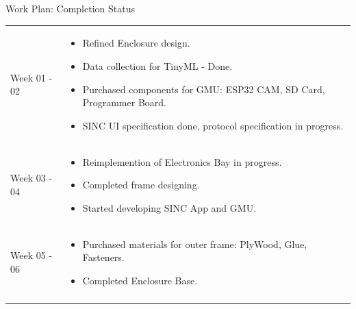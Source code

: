 \documentclass{beamer}
\begin{document}
\begin{frame} {Work Plan: Completion Status}

    \renewcommand\arraystretch{1.75}
    \renewcommand\midrule{{\color{leafColorSecondary} \vspace{-8pt}\rule{\textwidth}{0.75pt}\vspace{8pt}}}


    \begin{tabularx} {\textwidth} {
            >{\bfseries \raggedright \arraybackslash}m{2cm} >{\raggedright \arraybackslash}X
        }

        Week 01 - 02
        &
        \vspace{-0.35cm}
        \begin{itemize}
            \item Refined Enclosure design.
            \item Data collection for TinyML - Done.
            \item Purchased components for GMU: ESP32 CAM, SD Card, Programmer Board.
            \item SINC UI specification done, protocol specification in progress.
        \end{itemize}

        \\ \midrule

        Week 03 - 04
        &
        \vspace{-0.35cm}
        \begin{itemize}
            \item Reimplemention of Electronics Bay in progress.
            \item Completed frame designing.
            \item Started developing SINC App and GMU.
        \end{itemize}
        \\ \midrule

        Week 05 - 06
        &
        \vspace{-0.35cm}
        \begin{itemize}
            \item Purchased materials for outer frame: PlyWood, Glue, Fasteners.
            \item Completed Enclosure Base.
        \end{itemize}
        \\ \midrule


\end{tabularx}
\end{frame}
\end{document}
